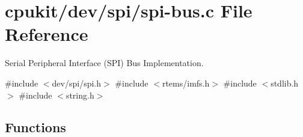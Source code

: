 \hypertarget{spi-bus_8c}{}\section{cpukit/dev/spi/spi-\/bus.c File Reference}
\label{spi-bus_8c}


Serial Peripheral Interface (S\+PI) Bus Implementation.  


{\ttfamily \#include $<$dev/spi/spi.\+h$>$}\newline
{\ttfamily \#include $<$rtems/imfs.\+h$>$}\newline
{\ttfamily \#include $<$stdlib.\+h$>$}\newline
{\ttfamily \#include $<$string.\+h$>$}\newline
\subsection*{Functions}
